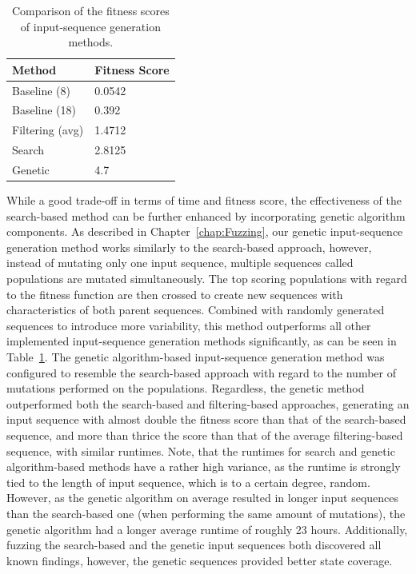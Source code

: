 \begin{table}[b]
	\centering
	\begin{tabular}{|l|l|}
		\hline
		\rowcolor[HTML]{EFEFEF} 
		\textbf{Method} & \textbf{Fitness Score}  \\ \hline
		Baseline (8)              	&  0.0542     \\ \hline
		Baseline (18)              	&  0.392      \\ \hline
		Filtering (avg)             &  1.4712     \\ \hline
		Search              		&  2.8125     \\ \hline
		Genetic              		&  4.7        \\ \hline
	\end{tabular}
	\caption{Comparison of the fitness scores of input-sequence generation methods.}
	\label{tab:compbasesearch}
\end{table}

While a good trade-off in terms of time and fitness score, the effectiveness of the search-based method can be further enhanced by incorporating genetic algorithm components. As described in Chapter~\ref{chap:Fuzzing}, our genetic input-sequence generation method works similarly to the search-based approach, however, instead of mutating only one input sequence, multiple sequences called populations are mutated simultaneously. The top scoring populations with regard to the fitness function are then crossed to create new sequences with characteristics of both parent sequences. Combined with randomly generated sequences to introduce more variability, this method outperforms all other implemented input-sequence generation methods significantly, as can be seen in Table~\ref{tab:compbasesearch}. The genetic algorithm-based input-sequence generation method was configured to resemble the search-based approach with regard to the number of mutations performed on the populations. Regardless, the genetic method outperformed both the search-based and filtering-based approaches, generating an input sequence with almost double the fitness score than that of the search-based sequence, and more than thrice the score than that of the average filtering-based sequence, with similar runtimes. Note, that the runtimes for search and genetic algorithm-based methods have a rather high variance, as the runtime is strongly tied to the length of input sequence, which is to a certain degree, random. However, as the genetic algorithm on average resulted in longer input sequences than the search-based one (when performing the same amount of mutations), the genetic algorithm had a longer average runtime of roughly 23 hours. Additionally, fuzzing the search-based and the genetic input sequences both discovered all known findings, however, the genetic sequences provided better state coverage.

